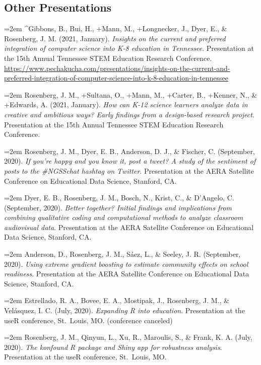 \documentclass[
  14,
]{article}
\begin{document}
\hypertarget{other-presentations}{%
\subsection{Other Presentations}\label{other-presentations}}

\hangindent=2em \^{}Gibbons, B., Bui, H., +Mann, M., +Longnecker, J.,
Dyer, E., \& Rosenberg, J. M. (2021, January). \emph{Insights on the
current and preferred integration of computer science into K-8 education
in Tennessee}. Presentation at the 15th Annual Tennessee STEM Education
Research Conference.
\url{https://www.pechakucha.com/presentations/insights-on-the-current-and-preferred-integration-of-computer-science-into-k-8-education-in-tennessee}

\hangindent=2em Rosenberg, J. M., +Sultana, O., +Mann, M., +Carter, B.,
+Kenner, N., \& +Edwards, A. (2021, January). \emph{How can K-12 science
learners analyze data in creative and ambitious ways? Early findings
from a design-based research project}. Presentation at the 15th Annual
Tennessee STEM Education Research Conference.

\hangindent=2em Rosenberg, J. M., Dyer, E. B., Anderson, D. J., \&
Fischer, C. (September, 2020). \emph{If you're happy and you know it,
post a tweet? A study of the sentiment of posts to the \#NGSSchat
hashtag on Twitter}. Presentation at the AERA Satellite Conference on
Educational Data Science, Stanford, CA.

\hangindent=2em Dyer, E. B., Rosenberg, J. M., Bosch, N., Krist, C., \&
D'Angelo, C. (September, 2020). \emph{Better together? Initial findings
and implications from combining qualitative coding and computational
methods to analyze classroom audiovisual data}. Presentation at the AERA
Satellite Conference on Educational Data Science, Stanford, CA.

\hangindent=2em Anderson, D., Rosenberg, J. M., Sáez, L., \& Seeley, J.
R. (September, 2020). \emph{Using extreme gradient boosting to estimate
community effects on school readiness}. Presentation at the AERA
Satellite Conference on Educational Data Science, Stanford, CA.

\hangindent=2em Estrellado, R. A., Bovee, E. A., Mostipak, J.,
Rosenberg, J. M., \& Velásquez, I. C. (July, 2020). \emph{Expanding R
into education}. Presentation at the useR conference, St.~Louis, MO.
(conference canceled)

\hangindent=2em Rosenberg, J. M., Qinyun, L., Xu, R., Maroulis, S., \&
Frank, K. A. (July, 2020). \emph{The konfound R package and Shiny app
for robustness analysis}. Presentation at the useR conference,
St.~Louis, MO.
\end{document}
